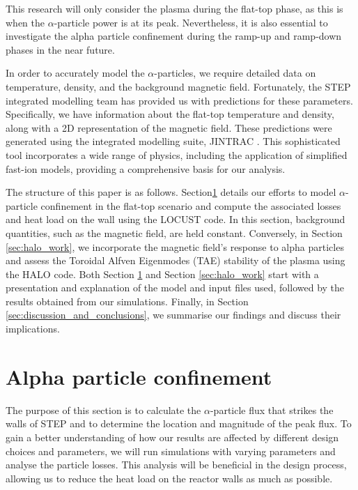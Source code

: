 \documentclass[10pt, a4paper, twoside]{article}
\begin{document}
This research will only consider the plasma during the flat-top phase, as this is when the $\alpha$-particle power is at its peak. Nevertheless, it is also essential to investigate the alpha particle confinement during the ramp-up and ramp-down phases in the near future.

In order to accurately model the $\alpha$-particles, we require detailed data on temperature, density, and the background magnetic field. Fortunately, the STEP integrated modelling team has provided us with predictions for these parameters. Specifically, we have information about the flat-top temperature and density, along with a 2D representation of the magnetic field. These predictions were generated using the integrated modelling suite, JINTRAC \cite{meyer2023, mitchell2023}. This sophisticated tool incorporates a wide range of physics, including the application of simplified fast-ion models, providing a comprehensive basis for our analysis.

The structure of this paper is as follows. Section\ref{sec:locust_work} details our efforts to model $\alpha$-particle confinement in the flat-top scenario and compute the associated losses and heat load on the wall using the LOCUST code. In this section, background quantities, such as the magnetic field, are held constant. Conversely, in Section \ref{sec:halo_work}, we incorporate the magnetic field's response to alpha particles and assess the Toroidal Alfven Eigenmodes (TAE) stability of the plasma using the HALO code. Both Section \ref{sec:locust_work} and Section \ref{sec:halo_work} start with a presentation and explanation of the model and input files used, followed by the results obtained from our simulations. Finally, in Section \ref{sec:discussion_and_conclusions}, we summarise our findings and discuss their implications.

\section{Alpha particle confinement}
\label{sec:locust_work}

The purpose of this section is to calculate the $\alpha$-particle flux that strikes the walls of STEP and to determine the location and magnitude of the peak flux. To gain a better understanding of how our results are affected by different design choices and parameters, we will run simulations with varying parameters and analyse the particle losses. This analysis will be beneficial in the design process, allowing us to reduce the heat load on the reactor walls as much as possible.
\end{document}
